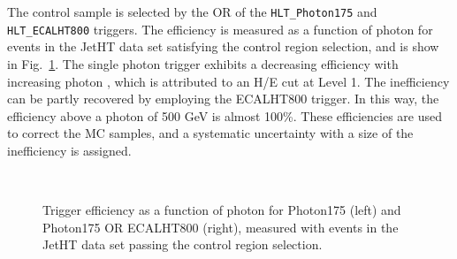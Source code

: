 The \gj control sample is selected by the OR of the \verb!HLT_Photon175! and
\verb!HLT_ECALHT800! triggers. The efficiency is measured as a function of photon
\Pt for events in the JetHT data set satisfying the \gj control region selection,
and is show in Fig.~\ref{fig:photon_turnons}. The single photon trigger exhibits a decreasing efficiency
with increasing photon \Pt, which is attributed to an H/E cut at Level 1. The inefficiency
can be partly recovered by employing the ECALHT800 trigger. In this way, the 
efficiency above a photon \Pt of 500 GeV is almost 100\%. These efficiencies are used
to correct the MC samples, and a systematic uncertainty with a size of the 
inefficiency is assigned.

\begin{figure}[h!]
  \begin{center}
     ~~\
     \\
    \caption{Trigger efficiency as a function of photon \Pt for Photon175 (left) and Photon175 OR ECALHT800 (right), measured with events in the JetHT data set passing the \gj control region selection.}
    \label{fig:photon_turnons}
  \end{center}
\end{figure}



